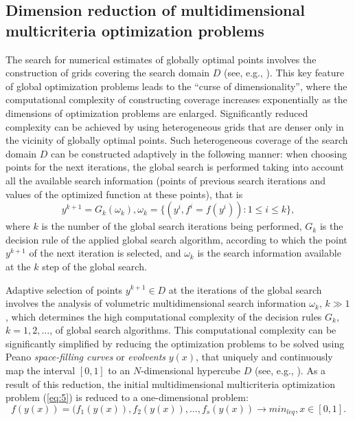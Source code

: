 \documentclass[smallextended]{svjour3}       %
\begin{document}
\subsection{Dimension reduction of multidimensional multicriteria optimization problems}

The search for numerical estimates of globally optimal points involves the construction of grids covering the search domain $D$ (see, e.g., \cite{c17,c18,c19,c20,c21,c22,c23,c24,c25}). This key feature of global optimization problems leads to the ``curse of dimensionality'', where the computational complexity of constructing coverage increases exponentially as the dimensions of optimization problems are enlarged. Significantly reduced complexity can be achieved by using heterogeneous grids that are denser only in the vicinity of globally optimal points. Such heterogeneous coverage of the search domain $D$ can be constructed adaptively in the following manner: when choosing points for the next iterations, the global search is performed taking into account all the available search information (points of previous search iterations and values of the optimized function at these points), that is
\begin{equation}\label{eq:9}
y^{k+1}=G_k(\omega_k), \omega_k=\{(y^i,f^i=f(y^i)): 1 \leq i \leq k \},
\end{equation}
where $k$ is the number of the global search iterations being performed, $G_k$ is the decision rule of the applied global search algorithm, according to which the point $y^{k+1}$ of the next iteration is selected, and $\omega_k$ is the search information available at the $k$ step of the global search.

Adaptive selection of points $y^{k+1} \in D$ at the iterations of the global search involves the analysis of volumetric multidimensional search information $\omega_k$, $k \gg 1$, which determines the high computational complexity of the decision rules $G_k$, $k=1,2,\dots$, of global search algorithms. This computational complexity can be significantly simplified by reducing the optimization problems to be solved using Peano \textit{space-filling curves} or \textit{evolvents} $y(x)$, that uniquely and continuously map the interval $[0,1]$ to an $N$-dimensional hypercube $D$ (see, e.g., \cite{c17,c18,c23}). As a result of this reduction, the initial multidimensional multicriteria optimization problem (\ref{eq:5}) is reduced to a one-dimensional problem:
\begin{equation}\label{eq:10}
f(y(x)) = (f_1(y(x)), f_2(y(x)), \dots , f_s(y(x)) \to min_{leq},  x \in [0,1].
\end{equation}
\end{document}
